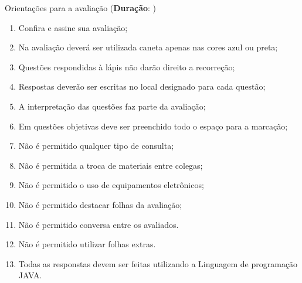 \begin{framed}
	\begin{center}
		Orientações para a avaliação (\textbf{Duração}: \underline{\duracao})
	\end{center}
		\begin{multicols}{2}
		{\footnotesize
		\begin{enumerate}
		\itemsep0em
		\item Confira e assine sua avaliação;
		\item Na avaliação deverá ser utilizada caneta apenas nas cores azul ou preta;
		\item Questões respondidas à lápis não darão direito a recorreção;
		\item Respostas deverão ser escritas no local designado para cada questão;
		\item A interpretação das questões faz parte da avaliação;
		\item Em questões objetivas deve ser preenchido todo o espaço para a marcação;
		\item Não é permitido qualquer tipo de consulta;
		\item Não é permitida a troca de materiais entre colegas;
		\item Não é permitido o uso de equipamentos eletrônicos;
		\item Não é permitido destacar folhas da avaliação;
		\item Não é permitido conversa entre os avaliados.		
		\item Não é permitido utilizar folhas extras.
		\item Todas as responstas devem ser feitas utilizando a Linguagem de programação JAVA.
		\end{enumerate}
		}
		\end{multicols}
\end{framed}